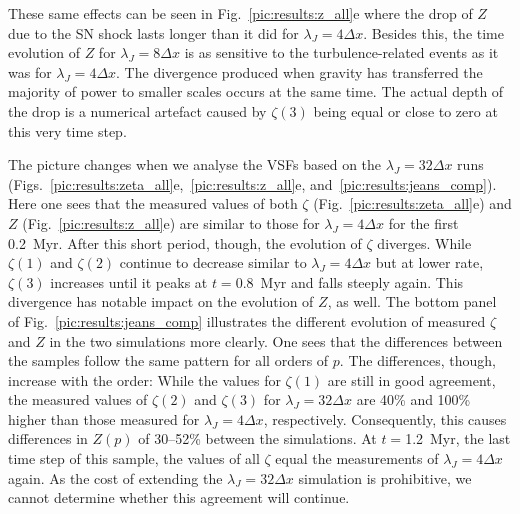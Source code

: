 These same effects can be seen in Fig.~\ref{pic:results:z_all}e where the drop of $Z$ due to the SN shock lasts longer than it did for $\lambda_J = 4\Delta{}x$. 
Besides this, the time evolution of $Z$ for $\lambda_J = 8\Delta{}x$ is as sensitive to the turbulence-related events as it was for $\lambda_J = 4\Delta{}x$.
The divergence produced when gravity has transferred the majority of power to smaller scales occurs at the same time. 
The actual depth of the drop is a numerical artefact caused by $\zeta(3)$ being equal or close to zero at this very time step. 

The picture changes when we analyse the VSFs based on the $\lambda_J = 32\Delta{}x$ runs (Figs.~\ref{pic:results:zeta_all}e,~\ref{pic:results:z_all}e, and~\ref{pic:results:jeans_comp}).
Here one sees that the measured values of both $\zeta$ (Fig.~\ref{pic:results:zeta_all}e) and $Z$ (Fig.~\ref{pic:results:z_all}e) are similar to those for $\lambda_J = 4\Delta{}x$ for the first 0.2~Myr.
After this short period, though, the evolution of $\zeta$ diverges. 
While $\zeta(1)$ and $\zeta(2)$ continue to decrease similar to $\lambda_J = 4\Delta{}x$ but at lower rate, $\zeta(3)$ increases until it peaks at $t=0.8$~Myr and falls steeply again.
This divergence has notable impact on the evolution of $Z$, as well. 
The bottom panel of Fig.~\ref{pic:results:jeans_comp} illustrates the different evolution of measured $\zeta$ and $Z$ in the two simulations more clearly.
One sees that the differences between the samples follow the same pattern for all orders of $p$.
The differences, though, increase with the order:
While the values for $\zeta(1)$ are still in good agreement, the measured values of $\zeta(2)$ and $\zeta(3)$ for $\lambda_J = 32\Delta{}x$ are 40\% and 100\% higher than those measured for $\lambda_J = 4\Delta{}x$, respectively.
Consequently, this causes differences in $Z(p)$ of 30--52\% between the simulations.
At $t=$1.2~Myr, the last time step of this sample, the values of all $\zeta$ equal the measurements of $\lambda_J = 4\Delta{}x$ again.
As the cost of extending the $\lambda_J = 32\Delta{}x$ simulation is prohibitive, we cannot determine whether this agreement will continue.

